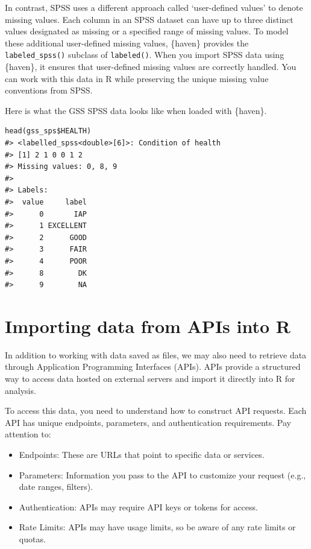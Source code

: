 \documentclass[
]{krantz}
\providecommand{\tightlist}{%
  \setlength{\itemsep}{0pt}\setlength{\parskip}{0pt}}
\begin{document}
In contrast, SPSS uses a different approach called `user-defined values' to denote missing values. Each column in an SPSS dataset can have up to three distinct values designated as missing or a specified range of missing values. To model these additional user-defined missing values, \{haven\} provides the \texttt{labeled\_spss()} subclass of \texttt{labeled()}. When you import SPSS data using \{haven\}, it ensures that user-defined missing values are correctly handled. You can work with this data in R while preserving the unique missing value conventions from SPSS.

Here is what the GSS SPSS data looks like when loaded with \{haven\}.

\begin{verbatim}
head(gss_sps$HEALTH)
#> <labelled_spss<double>[6]>: Condition of health
#> [1] 2 1 0 0 1 2
#> Missing values: 0, 8, 9
#> 
#> Labels:
#>  value     label
#>      0       IAP
#>      1 EXCELLENT
#>      2      GOOD
#>      3      FAIR
#>      4      POOR
#>      8        DK
#>      9        NA
\end{verbatim}

\hypertarget{importing-data-from-apis-into-r}{%
\section{Importing data from APIs into R}\label{importing-data-from-apis-into-r}}

In addition to working with data saved as files, we may also need to retrieve data through Application Programming Interfaces (APIs). APIs provide a structured way to access data hosted on external servers and import it directly into R for analysis.

To access this data, you need to understand how to construct API requests. Each API has unique endpoints, parameters, and authentication requirements. Pay attention to:

\begin{itemize}
\tightlist
\item
  Endpoints: These are URLs that point to specific data or services.
\item
  Parameters: Information you pass to the API to customize your request (e.g., date ranges, filters).
\item
  Authentication: APIs may require API keys or tokens for access.
\item
  Rate Limits: APIs may have usage limits, so be aware of any rate limits or quotas.
\end{itemize}
\end{document}
